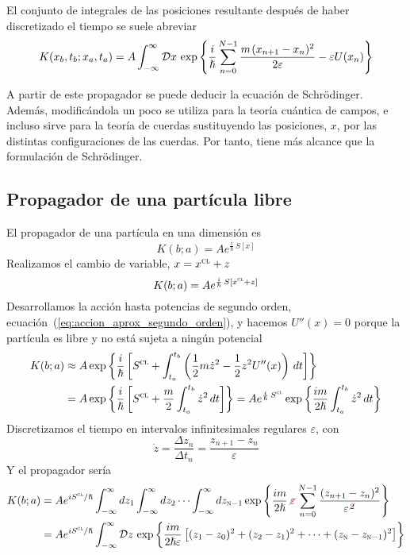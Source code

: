 El conjunto de integrales de las posiciones resultante después de
haber discretizado el tiempo se suele abreviar
\[
  K(x_b,t_b;x_a,t_a)
  = A \int_{-\infty}^{\infty} \mathcal{D} x
  \,\exp\left\{
  \dfrac{i}{\hslash}\sum_{n=0}^{N-1}\dfrac{m\kern1pt(x_{n+1}-x_n)^2}{2\varepsilon} - \varepsilon U(x_n)
  \right\}
\]


A partir de este propagador se puede deducir la ecuación de
Schrödinger. Además, modificándola un poco se utiliza para la teoría
cuántica de campos, e incluso sirve para la teoría de cuerdas
sustituyendo las posiciones, $x$, por las distintas configuraciones de
las cuerdas.  Por tanto, tiene más alcance que la formulación de
Schrödinger.

\subsection{Propagador de una partícula libre}

El propagador de una partícula en una dimensión es
\[
  K(b;a)
  =
  A e^{\frac{i}{\hslash}\,S[x]}
\]
Realizamos el cambio de variable, $x = x^{\textsc{cl}} + z$
\[
  K(b;a)
  =
  A e^{\frac{i}{\hslash}\,S[x^{\textsc{cl}}+z]}
\]
Desarrollamos la acción hasta potencias de segundo orden,
ecuación~(\ref{eq:accion_aprox_segundo_orden}), y hacemos $U''(x) = 0$
porque la partícula es libre y no está sujeta a ningún potencial
\begin{align*}
  K(b;a)
  &\approx
    A \exp\left\{\dfrac{i}{\hslash}\left[S^{\textsc{cl}}+\int_{t_a}^{t_b} \left(\dfrac{1}{2}m\dot{z}^2-\dfrac{1}{2}z^2U''(x)\right)\,dt\right]\right\}\\
  &= A \exp\left\{\dfrac{i}{\hslash}\left[S^{\textsc{cl}}
    +  \dfrac{m}{2} \int_{t_a}^{t_b}\dot{z}^2\, dt\right]
    \right\}
    =
    A e^{\frac{i}{\hslash}\,S^{\textsc{cl}}}
     \exp\left\{
    \dfrac{im}{2\hslash}\int_{t_a}^{t_b}\dot{z}^2\,dt
    \right\}
\end{align*}
Discretizamos el tiempo en intervalos infinitesimales regulares
$\varepsilon$, con
\[
  \dot{z} = \frac{\Delta z_n}{\Delta t_n} = \frac{z_{n+1}-z_n}{\varepsilon}
\]
Y el propagador sería
\begin{align*}
  K(b;a)
  &=
  A e^{i S^{\textsc{cl}}/\hslash} \int_{-\infty}^{\infty} dz_1
  \int_{-\infty}^{\infty} dz_2
  \cdots
  \int_{-\infty}^{\infty} dz_{\textsc{n}-1}
  \exp\left\{
  \dfrac{im}{2\hslash}\kern1pt\cancelout{\varepsilon}\sum_{n=0}^{N-1}\dfrac{(z_{n+1}-z_n)^2}{\varepsilon^{\cancelout{\scriptstyle 2}}}
  \right\}\\
  &=
  A e^{iS^{\textsc{cl}}/\hslash}\int_{-\infty}^{\infty} \mathcal{D}z\,
  \exp\left\{
    \dfrac{im}{2\hslash\varepsilon}
    \left[
    (z_1-z_0)^2 + (z_2-z_1)^2 + \cdots + (z_{\textsc{n}} - z_{\textsc{n}-1})^2
    \right]
  \right\}
\end{align*}

